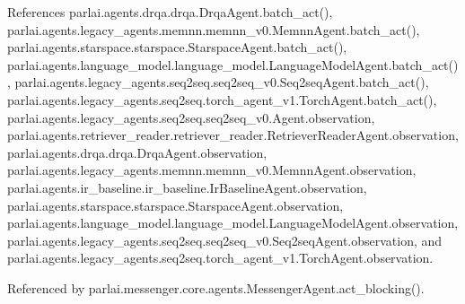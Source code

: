 References parlai.\+agents.\+drqa.\+drqa.\+Drqa\+Agent.\+batch\+\_\+act(), parlai.\+agents.\+legacy\+\_\+agents.\+memnn.\+memnn\+\_\+v0.\+Memnn\+Agent.\+batch\+\_\+act(), parlai.\+agents.\+starspace.\+starspace.\+Starspace\+Agent.\+batch\+\_\+act(), parlai.\+agents.\+language\+\_\+model.\+language\+\_\+model.\+Language\+Model\+Agent.\+batch\+\_\+act(), parlai.\+agents.\+legacy\+\_\+agents.\+seq2seq.\+seq2seq\+\_\+v0.\+Seq2seq\+Agent.\+batch\+\_\+act(), parlai.\+agents.\+legacy\+\_\+agents.\+seq2seq.\+torch\+\_\+agent\+\_\+v1.\+Torch\+Agent.\+batch\+\_\+act(), parlai.\+agents.\+legacy\+\_\+agents.\+seq2seq.\+seq2seq\+\_\+v0.\+Agent.\+observation, parlai.\+agents.\+retriever\+\_\+reader.\+retriever\+\_\+reader.\+Retriever\+Reader\+Agent.\+observation, parlai.\+agents.\+drqa.\+drqa.\+Drqa\+Agent.\+observation, parlai.\+agents.\+legacy\+\_\+agents.\+memnn.\+memnn\+\_\+v0.\+Memnn\+Agent.\+observation, parlai.\+agents.\+ir\+\_\+baseline.\+ir\+\_\+baseline.\+Ir\+Baseline\+Agent.\+observation, parlai.\+agents.\+starspace.\+starspace.\+Starspace\+Agent.\+observation, parlai.\+agents.\+language\+\_\+model.\+language\+\_\+model.\+Language\+Model\+Agent.\+observation, parlai.\+agents.\+legacy\+\_\+agents.\+seq2seq.\+seq2seq\+\_\+v0.\+Seq2seq\+Agent.\+observation, and parlai.\+agents.\+legacy\+\_\+agents.\+seq2seq.\+torch\+\_\+agent\+\_\+v1.\+Torch\+Agent.\+observation.



Referenced by parlai.\+messenger.\+core.\+agents.\+Messenger\+Agent.\+act\+\_\+blocking().

